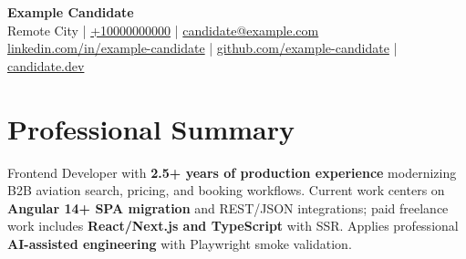 \documentclass[letterpaper,10pt]{article}
\newlength{\cvHeaderNameGap}
\newlength{\cvHeaderContactGap}
\newlength{\cvHeaderToSectionAdjust}
\begin{document}
\begin{center}
  {\fontsize{24}{26}\selectfont\bfseries Example Candidate} \\[\cvHeaderNameGap]
  Remote City \enspace|\enspace
  \href{tel:+10000000000}{+10000000000} \enspace|\enspace
  \href{mailto:candidate@example.com}{candidate@example.com} \\[\cvHeaderContactGap]
  \href{https://linkedin.com/in/example-candidate}{linkedin.com/in/example-candidate} \enspace|\enspace
  \href{https://github.com/example-candidate}{github.com/example-candidate} \enspace|\enspace
  \href{https://candidate.dev}{candidate.dev}
\end{center}
\vspace{\cvHeaderToSectionAdjust}

\section{Professional Summary}
Frontend Developer with \textbf{2.5+ years of production experience} modernizing B2B aviation search, pricing, and booking workflows. Current work centers on \textbf{Angular 14+ SPA migration} and REST/JSON integrations; paid freelance work includes \textbf{React/Next.js and TypeScript} with SSR. Applies professional \textbf{AI-assisted engineering} with Playwright smoke validation.
\end{document}
